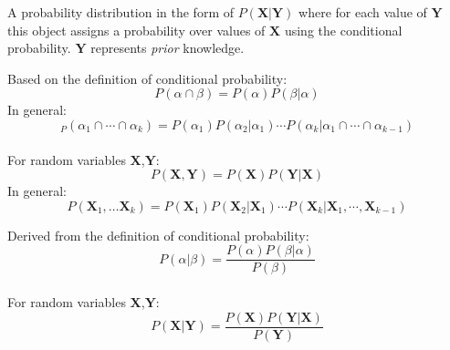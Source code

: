 {%
  A \gls{probability distribution} in the form of $P(\bm{X}|\bm{Y})$ where for each value of $\bm{Y}$ this object assigns a probability over values of $\bm{X}$ using the \gls{conditional probability}. $\bm{Y}$ represents \textit{prior} knowledge.
}


{%
  Based on the definition of \gls{conditional probability}:
  \begin{equation*}
    P(\alpha\cap\beta)=P(\alpha)P(\beta|\alpha)
  \end{equation*}
  In general:
  \begin{equation*}
    _P(\alpha_1\cap\cdots\cap\alpha_k)=P(\alpha_1)P(\alpha_2|\alpha_1)\cdots P(\alpha_k|\alpha_1\cap\cdots\cap\alpha_{k-1})
  \end{equation*}\\[0.1cm]
  For \glspl{random variable} $\bm{X}$,$\bm{Y}$:
  \begin{equation*}
    P(\bm{X},\bm{Y})=P(\bm{X})P(\bm{Y}|\bm{X})
  \end{equation*}
  In general:
  \begin{equation*}
    P(\bm{X}_1,\dots\bm{X}_k)=P(\bm{X}_1)P(\bm{X}_2|\bm{X}_1)\cdots P(\bm{X}_k|\bm{X}_1,\cdots,\bm{X}_{k-1})
  \end{equation*}

}

{%
  Derived from the definition of \gls{conditional probability}:
  \begin{equation*}
    P(\alpha|\beta)=\frac{P(\alpha)P(\beta|\alpha)}{P(\beta)}
  \end{equation*}\\[0.1cm]

  For \glspl{random variable} $\bm{X}$,$\bm{Y}$:
  \begin{equation*}
    P(\bm{X}|\bm{Y})=\frac{P(\bm{X})P(\bm{Y}|\bm{X})}{P(\bm{Y})}
  \end{equation*}
}

